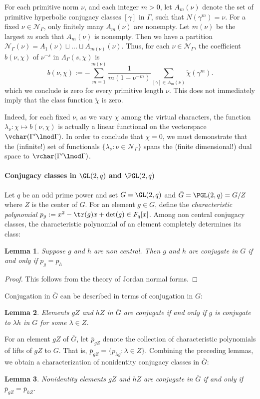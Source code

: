 \documentclass[11pt]{amsart}
\theoremstyle{definition}
\theoremstyle{plain}
\newtheorem{lemma}{Lemma}
\theoremstyle{remark}
\begin{document}
For each primitive norm $\nu$, and each integer $m>0$, let $A_m(\nu)$ denote the set of primitive hyperbolic conjugacy classes $[\gamma]$ in $\Gamma$, such that $N(\gamma^m)=\nu$.
For a fixed $\nu \in \mathcal{N}_\Gamma$, only finitely many $A_m(\nu)$ are nonempty.
Let $m(\nu)$ be the largest $m$ such that $A_m(\nu)$ is nonempty.
Then we have a partition $\mathcal{N}_\Gamma(\nu)=A_1(\nu)\sqcup ...\sqcup A_{m(\nu)}(\nu)$.
Thus, for each $\nu \in \mathcal{N}_\Gamma$, the  coefficient $b(\nu,\chi)$ of $\nu^{-s}$ in $\Lambda_\Gamma(s,\chi)$  is
\[ b(\nu,\chi):= -\sum_{m=1}^{m(\nu)} \frac{1}{m(1-\nu^{-m})} \sum_{[\gamma]\in A_m(\nu)} \tilde{\chi}(\gamma^m).
\]
which we conclude is zero for every primitive length $\nu$.
This does not immediately imply that the class function $\tilde{\chi}$ is zero.

Indeed, for each fixed $\nu$, as we vary $\chi$ among the virtual characters, the function  $\lambda_\nu: \chi \mapsto b(\nu,\chi)$ is actually a linear functional on the vectorspace $\vchar(\Gamma' \lmod \Gamma)$.
In order to conclude that $\chi=0$, we must demonstrate that the (infinite!) set of functionals $\{ \lambda_\nu: \nu \in \mathcal{N}_\Gamma\}$ spans the (finite dimensional!) dual space to $\vchar(\Gamma'\lmod \Gamma)$.
\paragraph{Conjugacy classes in $\GL(2,q)$ and $\PGL(2,q)$}
Let $q$ be an odd prime power and set $G=\GL(2,q)$ and $\bar{G}=\PGL(2,q)=G/ Z$ where $Z$ is the center of $G$.
For an element $g\in G$, define the \emph{characteristic polynomial} $p_{g}:=x^{2}-\tr(g)x+\det(g) \in F_{q}[x]$.
Among non central conjugacy classes, the characteristic polynomial of an element completely determines its class:
\begin{lemma}
	Suppose $g$ and $h$ are non central.
	Then $g$ and $h$ are conjugate in $G$ if and only if $p_{g}=p_{h}$
\end{lemma}
\begin{proof}
	This follows from the theory of Jordan normal forms.
\end{proof}
Conjugation in $\bar{G}$ can be described in terms of conjugation in $G$:
\begin{lemma}
	Elements $gZ$ and $hZ$ in $\bar{G}$ are conjugate if and only if $g$ is conjugate to $\lambda h$ in $G$ for some $\lambda \in Z$.
\end{lemma}
For an element $gZ$ of $\bar{G}$, let $\bar{p}_{gZ}$ denote the collection of characteristic polynomials of lifts of $gZ$ to $G$.
That is, $\bar{p}_{gZ}=\{p_{\lambda g}: \lambda \in Z\}$.
Combining the preceding lemmas, we obtain a characterization of nonidentity conjugacy classes in $\bar{G}$:
\begin{lemma}
	Nonidentity elements $gZ$ and $hZ$ are conjugate in $\bar{G}$ if and only if $\bar{p}_{gZ}=\bar{p}_{hZ}$.
\end{lemma}
\end{document}
